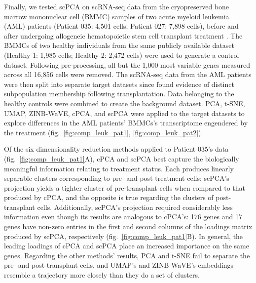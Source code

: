 Finally, we tested scPCA on scRNA-seq data from the cryopreserved bone marrow mononuclear cell (BMMC) samples of two acute myeloid leukemia (AML) patients (Patient 035: 4,501 cells; Patient 027: 7,898 cells), before and after undergoing allogeneic hematopoietic stem cell transplant treatment \cite{Zheng2017}. The BMMCs of two healthy individuals from the same publicly available dataset (Healthy 1: 1,985 cells; Healthy 2: 2,472 cells) were used to generate a control dataset. Following pre-processing, all but the 1,000 most variable genes measured across all 16,856 cells were removed. The scRNA-seq data from the AML patients were then split into separate target datasets since \citet{Zheng2017} found evidence of distinct subpopulation membership following transplantation. Data belonging to the healthy controls were combined to create the background dataset. PCA, t-SNE, UMAP, ZINB-WaVE, cPCA, and scPCA were applied to the target datasets to explore differences in the AML patients' BMMCs's transcriptome engendered by the treatment (fig.~\ref{fig:comp_leuk_pat1}, \ref{fig:comp_leuk_pat2}).

Of the six dimensionality reduction methods applied to Patient 035's data (fig.~\ref{fig:comp_leuk_pat1}A), cPCA and scPCA best capture the biologically meaningful information relating to treatment status. Each produces linearly separable clusters corresponding to pre- and post-treatment cells; scPCA's projection yields a tighter cluster of pre-transplant cells when compared to that produced by cPCA, and the opposite is true regarding the clusters of post-transplant cells. Additionally, scPCA's projection required considerably less information even though its results are analogous to cPCA's: 176 genes and 17 genes have non-zero entries in the first and second columns of the loadings matrix produced by scPCA, respectively (fig.~\ref{fig:comp_leuk_pat1}B). In general, the leading loadings of cPCA and scPCA place an increased importance on the same genes. Regarding the other methods' results, PCA and t-SNE fail to separate the pre- and post-transplant cells, and UMAP's and ZINB-WaVE's embeddings resemble a trajectory more closely than they do a set of clusters.

